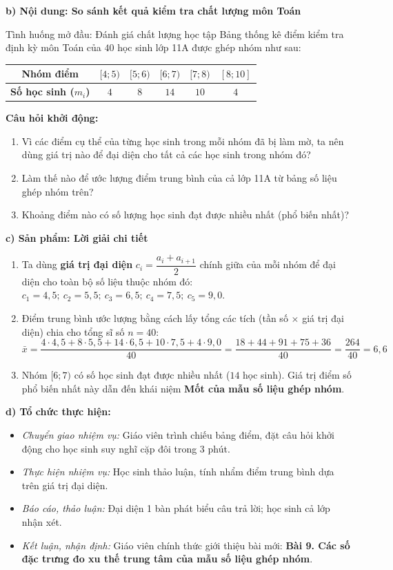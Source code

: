 \documentclass[12pt, a4paper]{article}
\begin{document}
\noindent \textbf{b) Nội dung: So sánh kết quả kiểm tra chất lượng môn Toán}
\begin{pedabox}{Tình huống mở đầu: Đánh giá chất lượng học tập}
Bảng thống kê điểm kiểm tra định kỳ môn Toán của $40$ học sinh lớp 11A được ghép nhóm như sau:
\begin{center}
\small
\begin{tabular}{|c|c|c|c|c|c|}
\hline
\textbf{Nhóm điểm} & $[4; 5)$ & $[5; 6)$ & $[6; 7)$ & $[7; 8)$ & $[8; 10]$ \\ \hline
\textbf{Số học sinh ($m_i$)} & $4$ & $8$ & $14$ & $10$ & $4$ \\ \hline
\end{tabular}
\end{center}
\textbf{Câu hỏi khởi động:}
\begin{enumerate}[leftmargin=0.6cm]
    \item Vì các điểm cụ thể của từng học sinh trong mỗi nhóm đã bị làm mờ, ta nên dùng giá trị nào để đại diện cho tất cả các học sinh trong nhóm đó?
    \item Làm thế nào để ước lượng điểm trung bình của cả lớp 11A từ bảng số liệu ghép nhóm trên?
    \item Khoảng điểm nào có số lượng học sinh đạt được nhiều nhất (phổ biến nhất)?
\end{enumerate}
\end{pedabox}

\noindent \textbf{c) Sản phẩm: Lời giải chi tiết}
\begin{enumerate}[leftmargin=0.6cm]
    \item Ta dùng \textbf{giá trị đại diện} $c_i = \dfrac{a_i + a_{i+1}}{2}$ chính giữa của mỗi nhóm để đại diện cho toàn bộ số liệu thuộc nhóm đó:
    $c_1 = 4{,}5; \ c_2 = 5{,}5; \ c_3 = 6{,}5; \ c_4 = 7{,}5; \ c_5 = 9{,}0$.
    \item Điểm trung bình ước lượng bằng cách lấy tổng các tích (tần số $\times$ giá trị đại diện) chia cho tổng sĩ số $n = 40$:
    $$\bar{x} = \dfrac{4 \cdot 4{,}5 + 8 \cdot 5{,}5 + 14 \cdot 6{,}5 + 10 \cdot 7{,}5 + 4 \cdot 9{,}0}{40} = \dfrac{18 + 44 + 91 + 75 + 36}{40} = \dfrac{264}{40} = 6{,}6$$
    \item Nhóm $[6; 7)$ có số học sinh đạt được nhiều nhất ($14$ học sinh). Giá trị điểm số phổ biến nhất này dẫn đến khái niệm \textbf{Mốt của mẫu số liệu ghép nhóm}.
\end{enumerate}

\noindent \textbf{d) Tổ chức thực hiện:}
\begin{itemize}[leftmargin=0.8cm]
    \item \textit{Chuyển giao nhiệm vụ:} Giáo viên trình chiếu bảng điểm, đặt câu hỏi khởi động cho học sinh suy nghĩ cặp đôi trong 3 phút.
    \item \textit{Thực hiện nhiệm vụ:} Học sinh thảo luận, tính nhẩm điểm trung bình dựa trên giá trị đại diện.
    \item \textit{Báo cáo, thảo luận:} Đại diện 1 bàn phát biểu câu trả lời; học sinh cả lớp nhận xét.
    \item \textit{Kết luận, nhận định:} Giáo viên chính thức giới thiệu bài mới: \textbf{Bài 9. Các số đặc trưng đo xu thế trung tâm của mẫu số liệu ghép nhóm}.
\end{itemize}
\end{document}
